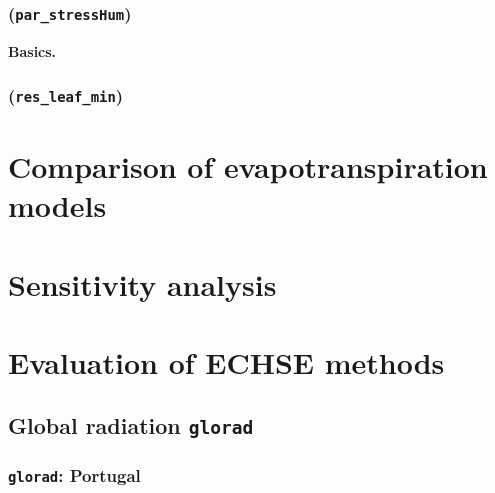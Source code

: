 \documentclass{scrreprt}
\begin{document}
\subsection{(\texttt{par\_stressHum})} \label{ssec:parest_veg_parstresshum}

\textbf{Basics.}

\subsection{(\texttt{res\_leaf\_min})} \label{ssec:parest_veg_resleafmin}


\chapter{Comparison of evapotranspiration models} \label{ch:modelcomp}


\chapter{Sensitivity analysis} \label{ch:sensana}


\chapter{Evaluation of ECHSE methods} \label{ch:methodcomp}

\section{Global radiation \texttt{glorad}}

\subsection{\texttt{glorad}: Portugal}
\end{document}
